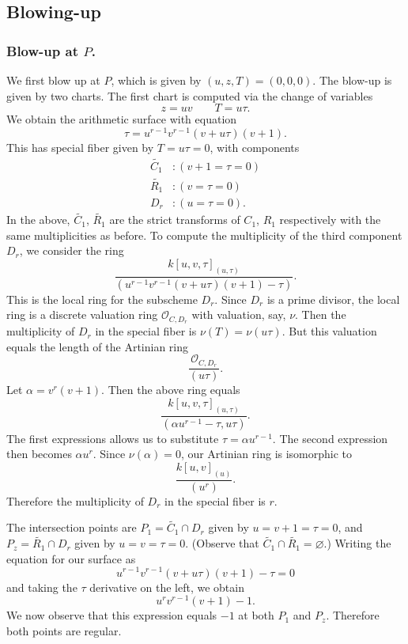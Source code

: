 \documentclass{article}
\theoremstyle{plain}
\theoremstyle{definition}
\theoremstyle{remark}
\renewcommand{\emptyset}{\varnothing}
\renewcommand{\tilde}[1]{\widetilde{#1}}
\newcommand{\sO}{\ensuremath{\mathscr{O}}}
\begin{document}
\subsection{Blowing-up}
\label{sec:blowing-up}

\subsubsection{Blow-up at $P$.}
\label{sec:blow-up-P}

We first blow up at $P$, which is given by $(u,z,T) = (0,0,0)$. The blow-up is given by two charts. The first chart is computed via the change of variables
\[
z = uv \qquad T = u\tau.
\]
We obtain the arithmetic surface with equation
\[
\tau = u^{r-1}v^{r-1}(v + u\tau)(v + 1).
\]
This has special fiber given by $T = u\tau = 0$, with components
\begin{align*}
  \tilde{C_1}&: (v + 1 = \tau = 0) \\
  \tilde{R_1}&: (v = \tau = 0) \\
  D_r&: (u = \tau = 0).
\end{align*}
In the above, $\tilde{C_1}$, $\tilde{R_1}$ are the strict transforms of $C_1$, $R_1$ respectively with the same multiplicities as before. To compute the multiplicity of the third component $D_r$, we consider the ring
\[
\frac{k[u,v,\tau]_{(u,\tau)}}{(u^{r-1}v^{r-1}(v + u\tau)(v + 1) - \tau)}.
\]
This is the local ring for the subscheme $D_r$. Since $D_r$ is a prime divisor, the local ring is a discrete valuation ring $\sO_{C,D_r}$ with valuation, say, $\nu$. Then the multiplicity of $D_r$ in the special fiber is $\nu(T) = \nu(u\tau)$. But this valuation equals the length of the Artinian ring
\[
\frac{\sO_{C,D_r}}{(u\tau)}.
\]
Let $\alpha = v^{r}(v+1)$. Then the above ring equals
\[
\frac{k[u,v,\tau]_{(u,\tau)}}{(\alpha u^{r-1} - \tau, u\tau)}.
\]
The first expressions allows us to substitute $\tau = \alpha u^{r-1}$. The second expression then becomes $\alpha u^r$. Since $\nu(\alpha) = 0$, our Artinian ring is isomorphic to
\[
\frac{k[u,v]_{(u)}}{(u^r)}.
\]
Therefore the multiplicity of $D_r$ in the special fiber is $r$.

The intersection points are $P_1 = \tilde{C_1} \cap D_r$ given by $u=v+1=\tau=0$, and $P_z = \tilde{R_1} \cap D_r$ given by $u=v=\tau=0$. (Observe that $\tilde{C_1} \cap \tilde{R_1} = \emptyset$.) Writing the equation for our surface as
\[
u^{r-1}v^{r-1}(v + u\tau)(v + 1) - \tau = 0
\]
and taking the $\tau$ derivative on the left, we obtain
\[
u^rv^{r-1}(v + 1) - 1.
\]
We now observe that this expression equals $-1$ at both $P_1$ and $P_z$. Therefore both points are regular.
\end{document}
